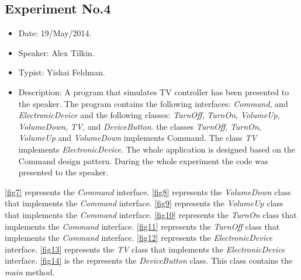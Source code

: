 \subsection{Experiment No.4}
\begin{itemize}
	\item Date: 19/May/2014.
	\item Speaker: Alex Tilkin.
	\item Typist: Yishai Feldman.
	\item Description: A program that simulates TV controller has been presented to the speaker. The program contains the following interfaces: \textit{Command}, and \textit{ElectronicDevice} and the following classes: \textit{TurnOff}, \textit{TurnOn}, \textit{VolumeUp}, \textit{VolumeDown}, \textit{TV}, and \textit{DeviceButton}. the classes \textit{TurnOff}, \textit{TurnOn}, \textit{VolumeUp} and \textit{VolumeDown} implements Command. The class \textit{TV} implements \textit{ElectronicDevice}. The whole application is designed based on the Command design pattern. During the whole experiment the code was presented to the speaker.
\end{itemize}
\autoref{fig7} represents the \textit{Command} interface. \autoref{fig8} represents the \textit{VolumeDown} class that implements the \textit{Command} interface. \autoref{fig9} represents the \textit{VolumeUp} class that implements the \textit{Command} interface. \autoref{fig10} represents the \textit{TurnOn} class that implements the \textit{Command} interface. \autoref{fig11} represents the \textit{TurnOff} class that implements the \textit{Command} interface. \autoref{fig12} represents the \textit{ElectronicDevice} interface. \autoref{fig13} represents the \textit{TV} class that implements the \textit{ElectronicDevice} interface. \autoref{fig14} is the represents the \textit{DeviceButton} class. This class contains the \textit{main} method.

